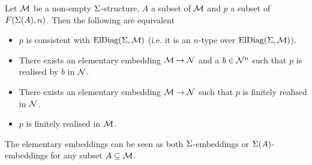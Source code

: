 \begin{lem}
    Let $\mathcal{M}$ be a non-empty 
    $\Sigma$-structure, 
    $A$ a subset of ${\mathcal{M}}$ and $p$ a subset of $F(\Sigma(A),n)$.
    Then the following are equivalent 
    \begin{itemize}
        \item $p$ is consistent with $\mathrm{ElDiag}(\Sigma,\mathcal{M})$ 
            (i.e. it is an $n$-type over $\mathrm{ElDiag}(\Sigma,\mathcal{M})$).
        \item There exists an elementary embedding $\mathcal{M} \to \mathcal{N}$ 
            and a $b \in {\mathcal{N}}^n$ such that $p$ 
            is realised by $b$ in $\mathcal{N}$.
        \item There exists an elementary embedding $\mathcal{M} \to \mathcal{N}$ 
            such that $p$ is finitely realised in $\mathcal{N}$.
        \item $p$ is finitely realised in $\mathcal{M}$.
    \end{itemize}
    The elementary embeddings can be seen as both $\Sigma$-embeddings or 
    $\Sigma(A)$-embeddings for any subset $A \subseteq \mathcal{M}$.
\end{lem}
